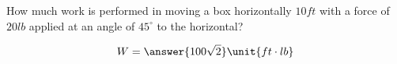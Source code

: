 \documentclass{ximera}
\author{Gregory Hartman \and Matthew Carr}
\begin{document}
\begin{exercise}




How much work is performed in moving a box horizontally $10\unit{ft}$ with a force of $20\unit{lb}$ applied at an angle of $45^{\circ}$ to the horizontal?

\begin{prompt}
\[
W=\answer{100\sqrt{2}}\unit{ft\cdot lb}
\]
\end{prompt}

\end{exercise}
\end{document}
